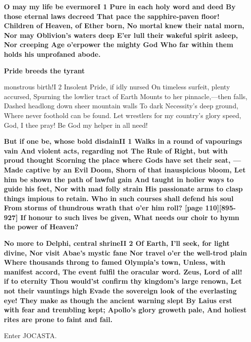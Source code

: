 \documentclass[11pt,letter]{book}
\begin{document}
\par \textbf{O may my life be evermoreI 1 Pure in each holy word and deed By those eternal laws decreed That pace the sapphire-paven floor! Children of Heaven, of Ether born, No mortal knew their natal morn, Nor may Oblivion’s waters deep E’er lull their wakeful spirit asleep, Nor creeping Age o’erpower the mighty God Who far within them holds his unprofaned abode.}
\par 

\par \textbf{Pride breeds the tyrant}
\par   monstrous birth!I 2 Insolent Pride, if idly nursed On timeless surfeit, plenty accursed, Spurning the lowlier tract of Earth Mounts to her pinnacle,—then falls, Dashed headlong down sheer mountain walls To dark Necessity’s deep ground, Where never foothold can be found. Let wrestlers for my country’s glory speed, God, I thee pray! Be God my helper in all need!

\par \textbf{But if one be, whose bold disdainII 1 Walks in a round of vapourings vain And violent acts, regarding not The Rule of Right, but with proud thought Scorning the place where Gods have set their seat, —Made captive by an Evil Doom, Shorn of that inauspicious bloom, Let him be shown the path of lawful gain And taught in holier ways to guide his feet, Nor with mad folly strain His passionate arms to clasp things impious to retain. Who in such courses shall defend his soul From storms of thundrous wrath that o’er him roll? [page 110][895-927] If honour to such lives be given, What needs our choir to hymn the power of Heaven?}
\par 

\par \textbf{No more to Delphi, central shrineII 2 Of Earth, I’ll seek, for light divine, Nor visit Abae’s mystic fane Nor travel o’er the well-trod plain Where thousands throng to famed Olympia’s town, Unless, with manifest accord, The event fulfil the oracular word. Zeus, Lord of all! if to eternity Thou would’st confirm thy kingdom’s large renown, Let not their vauntings high Evade the sovereign look of the everlasting eye! They make as though the ancient warning slept By Laius erst with fear and trembling kept; Apollo’s glory groweth pale, And holiest rites are prone to faint and fail.}
\par 

\par  Enter JOCASTA.
\end{document}
